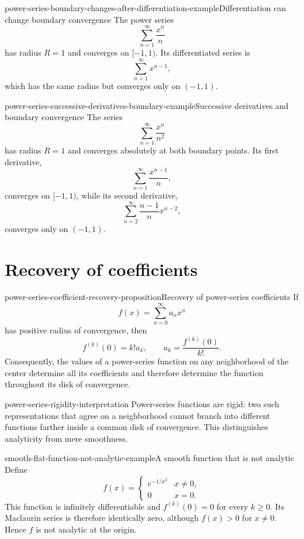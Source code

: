 \documentclass[preview]{standalone}
\begin{document}
\begin{snippetexample}{power-series-boundary-changes-after-differentiation-example}{Differentiation can change boundary convergence}
    The power series
    \[
        \sum_{n=1}^{\infty}\frac{x^n}{n}
    \]
    has radius \(R=1\) and converges on \([-1,1)\). Its differentiated series
    is
    \[
        \sum_{n=1}^{\infty}x^{n-1},
    \]
    which has the same radius but converges only on \((-1,1)\).
\end{snippetexample}

\begin{snippetexample}{power-series-successive-derivatives-boundary-example}{Successive derivatives and boundary convergence}
    The series
    \[
        \sum_{n=1}^{\infty}\frac{x^n}{n^2}
    \]
    has radius \(R=1\) and converges absolutely at both boundary points. Its
    first derivative,
    \[
        \sum_{n=1}^{\infty}\frac{x^{n-1}}n,
    \]
    converges on \([-1,1)\), while its second derivative,
    \[
        \sum_{n=2}^{\infty}\frac{n-1}{n}x^{n-2},
    \]
    converges only on \((-1,1)\).
\end{snippetexample}

\section{Recovery of coefficients}

\begin{snippetproposition}{power-series-coefficient-recovery-proposition}{Recovery of power-series coefficients}
    If
    \[
        f(x)=\sum_{n=0}^{\infty}a_nx^n
    \]
    has positive radius of convergence, then
    \[
        f^{(k)}(0)=k!a_k,
        \qquad
        a_k=\frac{f^{(k)}(0)}{k!}.
    \]
    Consequently, the values of a power-series function on any neighborhood
    of the center determine all its coefficients and therefore determine the
    function throughout its disk of convergence.
\end{snippetproposition}

\begin{snippet}{power-series-rigidity-interpretation}
    Power-series functions are rigid: two such representations that agree on
    a neighborhood cannot branch into different functions farther inside a
    common disk of convergence. This distinguishes analyticity from mere
    smoothness.
\end{snippet}

\begin{snippetexample}{smooth-flat-function-not-analytic-example}{A smooth function that is not analytic}
    Define
    \[
        f(x)=\begin{cases}
            e^{-1/x^2} & x\neq0,\\
            0 & x=0.
        \end{cases}
    \]
    This function is infinitely differentiable and
    \(f^{(k)}(0)=0\) for every \(k\geq0\). Its Maclaurin series is therefore
    identically zero, although \(f(x)>0\) for \(x\neq0\). Hence \(f\) is not
    analytic at the origin.
\end{snippetexample}
\end{document}
